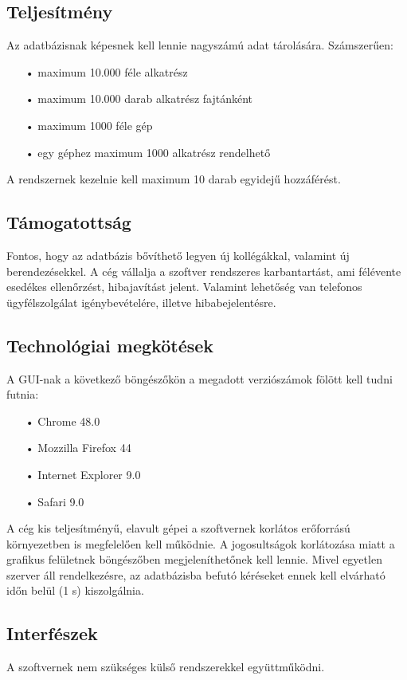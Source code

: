 \documentclass[12pt]{article}\usepackage[left=20mm,right=20mm,top=15mm,bottom=20mm]{geometry}
\begin{document}
\subsection{Teljesítmény}
Az adatbázisnak képesnek kell lennie nagyszámú adat tárolására. 
Számszerűen:
\begin{itemize}
\item[•] maximum 10.000 féle alkatrész
\item[•] maximum 10.000 darab alkatrész fajtánként
\item[•] maximum 1000 féle gép
\item[•] egy géphez maximum 1000 alkatrész rendelhető
\end{itemize}

A rendszernek kezelnie kell maximum 10 darab egyidejű hozzáférést. 

\subsection{Támogatottság}
Fontos, hogy az adatbázis bővíthető legyen új kollégákkal, valamint új berendezésekkel.
A cég vállalja a szoftver rendszeres karbantartást, ami félévente esedékes ellenőrzést, hibajavítást jelent.
Valamint lehetőség van telefonos ügyfélszolgálat igénybevételére, illetve hibabejelentésre.

\subsection{Technológiai megkötések}
A GUI-nak a következő böngészőkön a megadott verziószámok fölött kell tudni futnia:
\begin{itemize}
\item[•] Chrome 48.0
\item[•] Mozzilla Firefox 44
\item[•] Internet Explorer 9.0
\item[•] Safari 9.0
\end{itemize}

A cég kis teljesítményű, elavult gépei a szoftvernek korlátos erőforrású környezetben is megfelelően kell működnie. 
A jogosultságok korlátozása miatt a grafikus felületnek böngészőben megjeleníthetőnek kell lennie.
Mivel egyetlen szerver áll rendelkezésre, az adatbázisba befutó kéréseket ennek kell elvárható időn belül (1 s) kiszolgálnia.

\subsection{Interfészek}
A szoftvernek nem szükséges külső rendszerekkel együttműködni.
\end{document}
